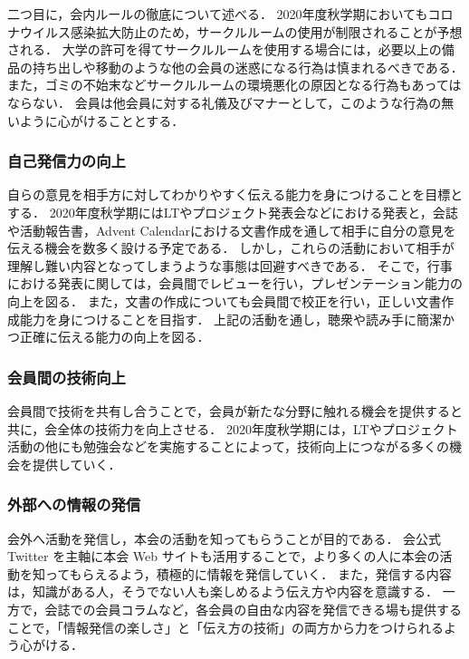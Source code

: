     二つ目に，会内ルールの徹底について述べる．
    2020年度秋学期においてもコロナウイルス感染拡大防止のため，サークルルームの使用が制限されることが予想される．
    大学の許可を得てサークルルームを使用する場合には，必要以上の備品の持ち出しや移動のような他の会員の迷惑になる行為は慎まれるべきである．
    また，ゴミの不始末などサークルルームの環境悪化の原因となる行為もあってはならない．
    会員は他会員に対する礼儀及びマナーとして，このような行為の無いように心がけることとする．

\subsubsection*{自己発信力の向上}
    自らの意見を相手方に対してわかりやすく伝える能力を身につけることを目標とする．
    2020年度秋学期にはLTやプロジェクト発表会などにおける発表と，会誌や活動報告書，Advent Calendarにおける文書作成を通して相手に自分の意見を伝える機会を数多く設ける予定である．
    しかし，これらの活動において相手が理解し難い内容となってしまうような事態は回避すべきである．
    そこで，行事における発表に関しては，会員間でレビューを行い，プレゼンテーション能力の向上を図る．
    また，文書の作成についても会員間で校正を行い，正しい文書作成能力を身につけることを目指す．
    上記の活動を通し，聴衆や読み手に簡潔かつ正確に伝える能力の向上を図る．

\subsubsection*{会員間の技術向上}
    会員間で技術を共有し合うことで，会員が新たな分野に触れる機会を提供すると共に，会全体の技術力を向上させる．
    2020年度秋学期には，LTやプロジェクト活動の他にも勉強会などを実施することによって，技術向上につながる多くの機会を提供していく．

\subsubsection*{外部への情報の発信}
    会外へ活動を発信し，本会の活動を知ってもらうことが目的である．
    会公式 Twitter を主軸に本会 Web サイトも活用することで，より多くの人に本会の活動を知ってもらえるよう，積極的に情報を発信していく．
    また，発信する内容は，知識がある人，そうでない人も楽しめるよう伝え方や内容を意識する．
    一方で，会誌での会員コラムなど，各会員の自由な内容を発信できる場も提供することで，「情報発信の楽しさ」と「伝え方の技術」の両方から力をつけられるよう心がける．
